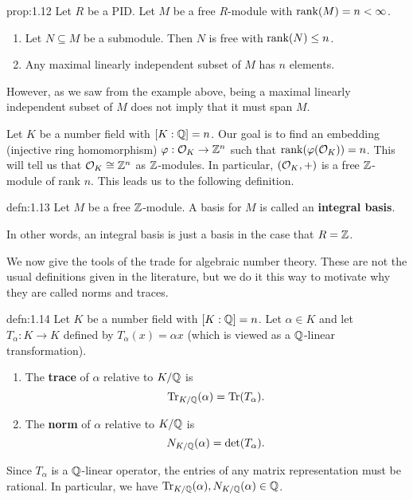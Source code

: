 \begin{prop}{prop:1.12}
    Let $R$ be a PID. Let $M$ be a free $R$-module with $\operatorname{rank}(M) = n < \infty$. 
    \begin{enumerate}[(1)]
        \item Let $N \subseteq M$ be a submodule. Then $N$ is free with $\operatorname{rank}(N) \leq n$. 
        \item Any maximal linearly independent subset of $M$ has $n$ elements. 
    \end{enumerate}
\end{prop}

However, as we saw from the example above, being a maximal linearly 
independent subset of $M$ does not imply that it must span $M$.

Let $K$ be a number field with $[K : \mathbb{Q}] = n$. Our goal is to find 
an embedding (injective ring homomorphism) $\varphi : {\cal O}_K \to \mathbb{Z}^n$ 
such that $\operatorname{rank}(\varphi({\cal O}_K)) = n$. This will tell us that 
${\cal O}_K \cong \mathbb{Z}^n$ as $\mathbb{Z}$-modules. In particular, $({\cal O}_K, +)$ 
is a free $\mathbb{Z}$-module of rank $n$. This leads us to the following definition. 

\begin{defn}{defn:1.13}
    Let $M$ be a free $\mathbb{Z}$-module. A basis for $M$ is called an 
    {\bf integral basis}.
\end{defn}

In other words, an integral basis is just a basis in the case that $R = \mathbb{Z}$.

We now give the tools of the trade for algebraic number theory. These are 
not the usual definitions given in the literature, but we do it this way to 
motivate why they are called norms and traces.

\begin{defn}{defn:1.14}
    Let $K$ be a number field with $[K : \mathbb{Q}] = n$. Let 
    $\alpha \in K$ and let $T_\alpha : K \to K$ defined by 
    $T_\alpha(x) = \alpha x$ (which is viewed as a $\mathbb{Q}$-linear transformation).
    \begin{enumerate}[(1)]
        \item The {\bf trace} of $\alpha$ relative to $K/\mathbb{Q}$ is 
        \[ \operatorname{Tr}_{K/\mathbb{Q}}(\alpha) = \operatorname{Tr}(T_\alpha). \] 
        \item The {\bf norm} of $\alpha$ relative to $K/\mathbb{Q}$ is 
        \[ N_{K/\mathbb{Q}}(\alpha) = \det(T_\alpha). \] 
    \end{enumerate}
\end{defn}

Since $T_\alpha$ is a $\mathbb{Q}$-linear operator, the entries of any matrix 
representation must be rational. In particular, we have $\operatorname{Tr}_{K/\mathbb{Q}}(\alpha), 
N_{K/\mathbb{Q}}(\alpha) \in \mathbb{Q}$.

